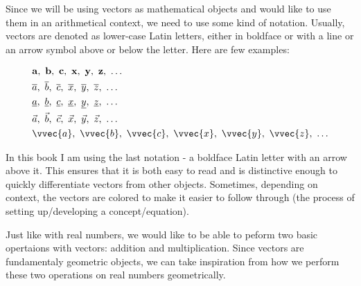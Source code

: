 Since we will be using vectors as mathematical objects and would like to use them in an arithmetical context, we need to use some kind of notation. Usually, vectors are denoted as lower-case Latin letters, either in boldface or with a line or an arrow symbol above or below the letter. Here are few examples:

\begin{align*}
	 & \mathbf{a},\  \mathbf{b},\ \mathbf{c},\ \mathbf{x},\ \mathbf{y},\ \mathbf{z},\ \dots                   \\
	 & \overline{a},\  \overline{b},\ \overline{c},\ \overline{x},\ \overline{y},\ \overline{z},\ \dots       \\
	 & \underline{a},\  \underline{b},\ \underline{c},\ \underline{x},\ \underline{y},\ \underline{z},\ \dots \\
	 & \vec{a},\  \vec{b},\ \vec{c},\ \vec{x},\ \vec{y},\ \vec{z},\ \dots                                     \\
	 & \vvec{a},\  \vvec{b},\ \vvec{c},\ \vvec{x},\ \vvec{y},\ \vvec{z},\ \dots
\end{align*}

In this book I am using the last notation - a boldface Latin letter with an arrow above it. This ensures that it is both easy to read and is distinctive enough to quickly differentiate vectors from other objects. Sometimes, depending on context, the vectors are colored to make it easier to follow through (the process of setting up/developing a concept/equation).


Just like with real numbers, we would like to be able to peform two basic opertaions with vectors: addition and multiplication. Since vectors are fundamentaly geometric objects, we can take inspiration from how we perform these two operations on real numbers geometrically.

